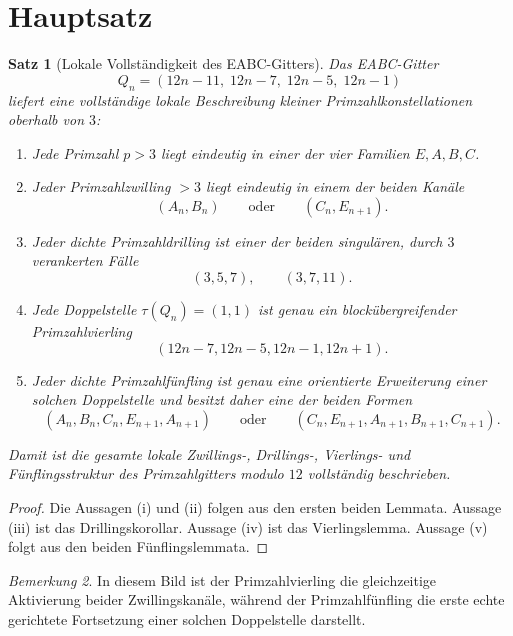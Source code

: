 \documentclass[11pt,a4paper]{article}
\newtheorem{theorem}{Satz}
\theoremstyle{definition}
\theoremstyle{remark}
\newtheorem{remark}[theorem]{Bemerkung}
\begin{document}
	\section{Hauptsatz}
	
	\begin{theorem}[Lokale Vollständigkeit des EABC-Gitters]
		Das EABC-Gitter
		\[
		Q_n=(12n-11,\;12n-7,\;12n-5,\;12n-1)
		\]
		liefert eine vollständige lokale Beschreibung kleiner Primzahlkonstellationen oberhalb von \(3\):
		
		\begin{enumerate}[label=\textup{(\roman*)}]
			\item Jede Primzahl \(p>3\) liegt eindeutig in einer der vier Familien \(E,A,B,C\).
			\item Jeder Primzahlzwilling \(>3\) liegt eindeutig in einem der beiden Kanäle
			\[
			(A_n,B_n)
			\qquad\text{oder}\qquad
			(C_n,E_{n+1}).
			\]
			\item Jeder dichte Primzahldrilling ist einer der beiden singulären, durch \(3\) verankerten Fälle
			\[
			(3,5,7),\qquad (3,7,11).
			\]
			\item Jede Doppelstelle \(\tau(Q_n)=(1,1)\) ist genau ein blockübergreifender Primzahlvierling
			\[
			(12n-7,12n-5,12n-1,12n+1).
			\]
			\item Jeder dichte Primzahlfünfling ist genau eine orientierte Erweiterung einer solchen Doppelstelle und besitzt daher eine der beiden Formen
			\[
			(A_n,B_n,C_n,E_{n+1},A_{n+1})
			\qquad\text{oder}\qquad
			(C_n,E_{n+1},A_{n+1},B_{n+1},C_{n+1}).
			\]
		\end{enumerate}
		
		Damit ist die gesamte lokale Zwillings-, Drillings-, Vierlings- und Fünflingsstruktur des Primzahlgitters modulo \(12\) vollständig beschrieben.
	\end{theorem}
	
	\begin{proof}
		Die Aussagen \textup{(i)} und \textup{(ii)} folgen aus den ersten beiden Lemmata.
		Aussage \textup{(iii)} ist das Drillingskorollar.
		Aussage \textup{(iv)} ist das Vierlingslemma.
		Aussage \textup{(v)} folgt aus den beiden Fünflingslemmata.
	\end{proof}
	
	\begin{remark}
		In diesem Bild ist der Primzahlvierling die gleichzeitige Aktivierung beider Zwillingskanäle, während der Primzahlfünfling die erste echte gerichtete Fortsetzung einer solchen Doppelstelle darstellt.
	\end{remark}
	
\end{document}
